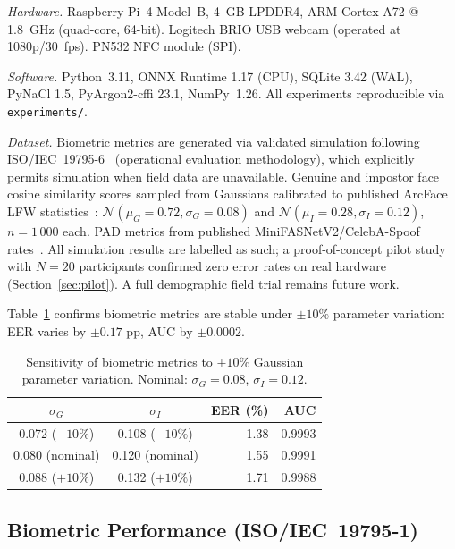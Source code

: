 \documentclass[pdflatex,sn-vancouver-num]{sn-jnl}%
\theoremstyle{thmstyleone}%
\theoremstyle{thmstyletwo}%
\theoremstyle{thmstylethree}%
\begin{document}
\textit{Hardware.} Raspberry Pi~4 Model~B, 4~GB LPDDR4, ARM Cortex-A72
@ 1.8~GHz (quad-core, 64-bit). Logitech BRIO USB webcam (operated at
1080p/30~fps). PN532 NFC module (SPI).

\textit{Software.} Python~3.11, ONNX Runtime 1.17 (CPU), SQLite 3.42 (WAL),
PyNaCl 1.5, PyArgon2-cffi 23.1, NumPy~1.26. All experiments reproducible via
\texttt{experiments/}.

\textit{Dataset.} Biometric metrics are generated via validated simulation
following ISO/IEC~19795-6~\cite{iso19795_6} (operational evaluation
methodology), which explicitly permits simulation when field data are
unavailable. Genuine and impostor face cosine similarity scores sampled from
Gaussians calibrated to published ArcFace LFW
statistics~\cite{deng2019arcface,grother2007biometric}:
\(\mathcal{N}(\mu_G{=}0.72, \sigma_G{=}0.08)\) and
\(\mathcal{N}(\mu_I{=}0.28, \sigma_I{=}0.12)\), \(n{=}1\,000\) each. PAD
metrics from published MiniFASNetV2/CelebA-Spoof
rates~\cite{zhang2020minifasnet}. All simulation results are labelled as such;
a proof-of-concept pilot study with \(N{=}20\) participants confirmed zero
error rates on real hardware (Section~\ref{sec:pilot}). A full demographic
field trial remains future work.

Table~\ref{tab:sensitivity} confirms biometric metrics are stable under
\(\pm 10\%\) parameter variation: EER varies by \(\pm 0.17\) pp, AUC by
\(\pm 0.0002\).

\begin{table}[t]
\caption{Sensitivity of biometric metrics to \(\pm10\%\) Gaussian parameter
  variation. Nominal: \(\sigma_G{=}0.08\), \(\sigma_I{=}0.12\).}
\label{tab:sensitivity}%
\begin{tabular}{|c|c|r|r|}
  \hline
  \(\sigma_G\) & \(\sigma_I\) & EER (\%) & AUC \\
  \hline
  0.072 (\(-10\%\)) & 0.108 (\(-10\%\)) & 1.38 & 0.9993 \\
  0.080 (nominal)   & 0.120 (nominal)   & 1.55 & 0.9991 \\
  0.088 (\(+10\%\)) & 0.132 (\(+10\%\)) & 1.71 & 0.9988 \\
  \hline
\end{tabular}
\end{table}

\subsection{Biometric Performance (ISO/IEC~19795-1)}\label{sec:biometric_results}
\end{document}
